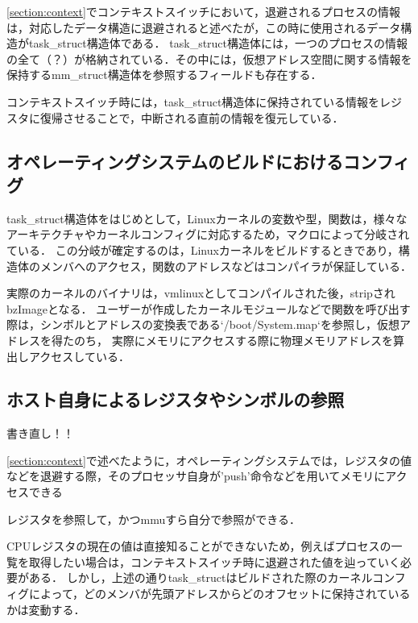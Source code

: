 \ref{section:context}でコンテキストスイッチにおいて，退避されるプロセスの情報は，対応したデータ構造に退避されると述べたが，この時に使用されるデータ構造がtask\_struct構造体である．
task\_struct構造体には，一つのプロセスの情報の全て（？）が格納されている．その中には，仮想アドレス空間に関する情報を保持するmm\_struct構造体を参照するフィールドも存在する．

コンテキストスイッチ時には，task\_struct構造体に保持されている情報をレジスタに復帰させることで，中断される直前の情報を復元している．

\subsection{オペレーティングシステムのビルドにおけるコンフィグ}

task\_struct構造体をはじめとして，Linuxカーネルの変数や型，関数は，様々なアーキテクチャやカーネルコンフィグに対応するため，マクロによって分岐されている．
この分岐が確定するのは，Linuxカーネルをビルドするときであり，構造体のメンバへのアクセス，関数のアドレスなどはコンパイラが保証している．

実際のカーネルのバイナリは，vmlinuxとしてコンパイルされた後，stripされbzImageとなる．
ユーザーが作成したカーネルモジュールなどで関数を呼び出す際は，シンボルとアドレスの変換表である`/boot/System.map`を参照し，仮想アドレスを得たのち，
実際にメモリにアクセスする際に物理メモリアドレスを算出しアクセスしている．

\subsection{ホスト自身によるレジスタやシンボルの参照}

書き直し！！

\ref{section:context}で述べたように，オペレーティングシステムでは，レジスタの値などを退避する際，そのプロセッサ自身が'push'命令などを用いてメモリにアクセスできる

レジスタを参照して，かつmmuすら自分で参照ができる．

CPUレジスタの現在の値は直接知ることができないため，例えばプロセスの一覧を取得したい場合は，コンテキストスイッチ時に退避された値を辿っていく必要がある．
しかし，上述の通りtask\_structはビルドされた際のカーネルコンフィグによって，どのメンバが先頭アドレスからどのオフセットに保持されているかは変動する．

